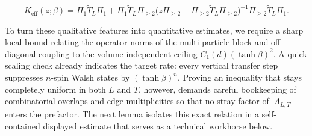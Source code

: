 \documentclass[11pt]{article}
\theoremstyle{definition}
\begin{document}
\[
  K_{\mathrm{eff}}(z; \beta) = \Pi_1 \widetilde{T}_L \Pi_1 + \Pi_1 \widetilde{T}_L \Pi_{\ge 2} \bigl(z \Pi_{\ge 2} - \Pi_{\ge 2} \widetilde{T}_L \Pi_{\ge 2}\bigr)^{-1} \Pi_{\ge 2} \widetilde{T}_L \Pi_1.
\]

To turn these qualitative features into quantitative estimates, we require a sharp
local bound relating the operator norms of the multi-particle block and off-diagonal
coupling to the volume-independent ceiling $C_1(d) (\tanh \beta)^2$. A quick scaling
check already indicates the target rate: every vertical transfer step suppresses
$n$-spin Walsh states by $(\tanh \beta)^n$. Proving an inequality that stays
completely uniform in both $L$ and $T$, however, demands careful bookkeeping of
combinatorial overlaps and edge multiplicities so that no stray factor of
$|\Lambda_{L,T}|$ enters the prefactor. The next lemma isolates this exact relation
in a self-contained displayed estimate that serves as a technical workhorse below.
\end{document}
